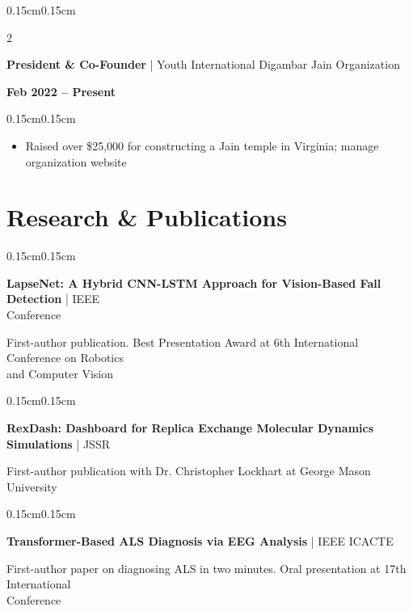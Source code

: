 \documentclass[10pt, letterpaper]{article}
\newenvironment{highlights}{
    \begin{itemize}[topsep=0pt, parsep=0pt, partopsep=0pt, itemsep=0pt, leftmargin=0.4cm]
}{
    \end{itemize}
}
\newenvironment{onecolentry}{
    \begin{adjustwidth}{0.15cm}{0.15cm}
}{
    \end{adjustwidth}
}
\newenvironment{twocolentry}[2][]{
    \onecolentry
    \def\secondColumn{#2}
    \setcolumnwidth{\fill, 4cm}
    \begin{paracol}{2}
}{
    \switchcolumn \raggedleft \secondColumn
    \end{paracol}
    \endonecolentry
}
\begin{document}
    \vspace{0.1cm}

    \begin{twocolentry}{\textbf{Feb 2022 -- Present}}
        \textbf{President \& Co-Founder} | Youth International Digambar Jain Organization
    \end{twocolentry}

    \vspace{0.05cm}
    \begin{onecolentry}
        \begin{highlights}
            \item Raised over \$25,000 for constructing a Jain temple in Virginia; manage organization website
        \end{highlights}
    \end{onecolentry}

    \section{Research \& Publications}

    \begin{onecolentry}
        \textbf{LapseNet: A Hybrid CNN-LSTM Approach for Vision-Based Fall Detection} | IEEE\\Conference
        
        \vspace{0.05cm}
        First-author publication. Best Presentation Award at 6th International Conference on Robotics\\and Computer Vision
    \end{onecolentry}

    \vspace{0.1cm}

    \begin{onecolentry}
        \textbf{RexDash: Dashboard for Replica Exchange Molecular Dynamics Simulations} | JSSR
        
        \vspace{0.05cm}
        First-author publication with Dr. Christopher Lockhart at George Mason University
    \end{onecolentry}

    \vspace{0.1cm}

    \begin{onecolentry}
        \textbf{Transformer-Based ALS Diagnosis via EEG Analysis} | IEEE ICACTE
        
        \vspace{0.05cm}
        First-author paper on diagnosing ALS in two minutes. Oral presentation at 17th International\\Conference
    \end{onecolentry}
\end{document}
